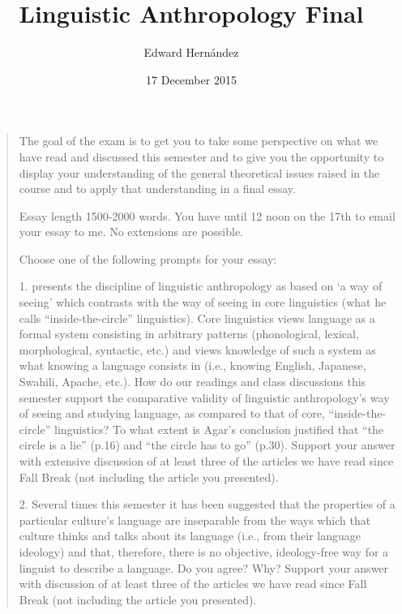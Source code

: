 \documentclass[man,12pt,natbib]{apa6}
\begin{document}
\title{Linguistic Anthropology Final}
\author{Edward Hern\'{a}ndez}
\date{17 December 2015}
\maketitle

\begin{quote}
	The goal of the exam is to get you to take some perspective on what we have
	read and discussed this semester and to give you the opportunity to display
	your understanding of the general theoretical issues raised in the course
	and to apply that understanding in a final essay.

	Essay length 1500-2000 words.  You have until 12 noon on the 17th to email
	your essay to me.  No extensions are possible.

	Choose one of the following prompts for your essay:

	1. %
	\citet{Agar95} presents the discipline of linguistic anthropology as based
	on `a way of seeing' which contrasts with the way of seeing in core
	linguistics (what he calls ``inside-the-circle'' linguistics). Core
	linguistics views language as a formal system consisting in arbitrary
	patterns (phonological, lexical, morphological, syntactic, etc.) and views
	knowledge of such a system as what knowing a language consists in (i.e.,
	knowing English, Japanese, Swahili, Apache, etc.).  How do our readings and
	class discussions this semester support the comparative validity of
	linguistic anthropology's way of seeing and studying language, as compared
	to that of core, ``inside-the-circle'' linguistics?  To what extent is
	Agar's conclusion justified that ``the circle is a lie'' (p.16) and ``the
	circle has to go'' (p.30).  Support your answer with extensive discussion
	of at least three of the articles we have read since Fall Break (not
	including the article you presented). 

	2. Several times this semester it has been suggested that the properties of
	a particular culture's language are inseparable from the ways which that
	culture thinks and talks about its language (i.e., from their language
	ideology) and that, therefore, there is no objective, ideology-free way for
	a linguist to describe a language.  Do you agree?  Why?  Support your
	answer with discussion of at least three of the articles we have read since
	Fall Break (not including the article you presented). 


\end{quote}
\end{document}
